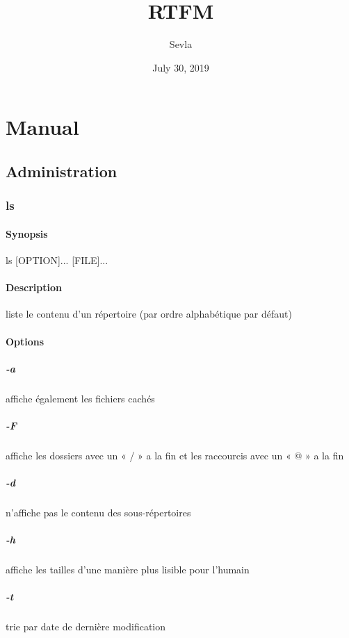 \documentclass{report}
\title{RTFM}
\author{Sevla}
\date{July 30, 2019}
\begin{document}
\maketitle

\part{Manual}

\chapter{Administration}

\section{ls}

\subsection{Synopsis}
ls [OPTION]... [FILE]...

\subsection{Description}
liste le contenu d'un répertoire (par ordre alphabétique par défaut)

\subsection{Options}

\subsubsection{-a}
affiche également les fichiers cachés
\subsubsection{-F}
affiche les dossiers avec un « / » a la fin et les raccourcis avec un « @ » a la fin
\subsubsection{-d}
n'affiche pas le contenu des sous-répertoires
\subsubsection{-h}
affiche les tailles d’une manière plus lisible pour l’humain
\subsubsection{-t}
trie par date de dernière modification
\end{document}
